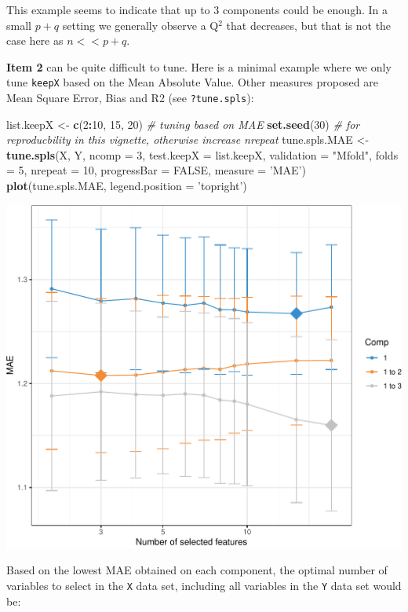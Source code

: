 \documentclass[]{book}
\newenvironment{Shaded}{\begin{snugshade}}{\end{snugshade}}
\newcommand{\CommentTok}[1]{\textcolor[rgb]{0.56,0.35,0.01}{\textit{#1}}}
\newcommand{\DataTypeTok}[1]{\textcolor[rgb]{0.13,0.29,0.53}{#1}}
\newcommand{\DecValTok}[1]{\textcolor[rgb]{0.00,0.00,0.81}{#1}}
\newcommand{\KeywordTok}[1]{\textcolor[rgb]{0.13,0.29,0.53}{\textbf{#1}}}
\newcommand{\NormalTok}[1]{#1}
\newcommand{\OperatorTok}[1]{\textcolor[rgb]{0.81,0.36,0.00}{\textbf{#1}}}
\newcommand{\OtherTok}[1]{\textcolor[rgb]{0.56,0.35,0.01}{#1}}
\newcommand{\StringTok}[1]{\textcolor[rgb]{0.31,0.60,0.02}{#1}}
\begin{document}
This example seems to indicate that up to 3 components could be enough. In a small \(p+q\) setting we generally observe a Q\(^2\) that decreases, but that is not the case here as \(n << p+q\).

\textbf{Item 2} can be quite difficult to tune. Here is a minimal example where we only tune \texttt{keepX} based on the Mean Absolute Value. Other measures proposed are Mean Square Error, Bias and R2 (see \texttt{?tune.spls}):

\begin{Shaded}
\begin{Highlighting}[]
\NormalTok{list.keepX <-}\StringTok{ }\KeywordTok{c}\NormalTok{(}\DecValTok{2}\OperatorTok{:}\DecValTok{10}\NormalTok{, }\DecValTok{15}\NormalTok{, }\DecValTok{20}\NormalTok{)}
\CommentTok{# tuning based on MAE}
\KeywordTok{set.seed}\NormalTok{(}\DecValTok{30}\NormalTok{) }\CommentTok{# for reproducbility in this vignette, otherwise increase nrepeat}
\NormalTok{tune.spls.MAE <-}\StringTok{ }\KeywordTok{tune.spls}\NormalTok{(X, Y, }\DataTypeTok{ncomp =} \DecValTok{3}\NormalTok{,}
                           \DataTypeTok{test.keepX =}\NormalTok{ list.keepX,}
                           \DataTypeTok{validation =} \StringTok{"Mfold"}\NormalTok{, }\DataTypeTok{folds =} \DecValTok{5}\NormalTok{,}
                           \DataTypeTok{nrepeat =} \DecValTok{10}\NormalTok{, }\DataTypeTok{progressBar =} \OtherTok{FALSE}\NormalTok{,}
                           \DataTypeTok{measure =} \StringTok{'MAE'}\NormalTok{)}
\KeywordTok{plot}\NormalTok{(tune.spls.MAE, }\DataTypeTok{legend.position =} \StringTok{'topright'}\NormalTok{)}
\end{Highlighting}
\end{Shaded}

\begin{center}\includegraphics[width=0.5\linewidth,]{Figures/05-pls-tune-1} \end{center}

Based on the lowest MAE obtained on each component, the optimal number of variables to select in the \texttt{X} data set, including all variables in the \texttt{Y} data set would be:
\end{document}
